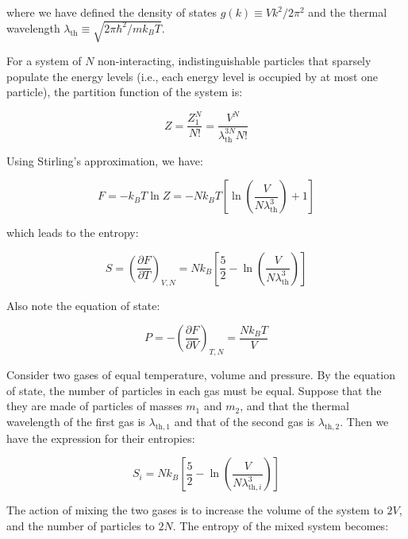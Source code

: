 \documentclass[12pt]{article}
\begin{document}
where we have defined the density of states $g(k) \equiv Vk^{2}/2\pi^{2}$ and the thermal wavelength $\lambda_{\text{th}} \equiv \sqrt{2\pi\hbar^{2}/m k_{B}T}$.

For a system of $N$ non-interacting, indistinguishable particles that sparsely populate the energy levels (i.e., each energy level is occupied by at most one particle), the partition function of the system is:

\begin{equation}
    Z = \frac{Z_{1}^{N}}{N!} = \frac{V^{N}}{\lambda_{\text{th}}^{3N} N!}
\end{equation}

Using Stirling's approximation, we have:

\begin{equation}
    F = -k_{B}T \ln{Z} = -Nk_{B}T \left[ \ln{\left( \frac{V}{N\lambda_{\text{th}}^{3}} \right)} + 1 \right]
\end{equation}

which leads to the entropy:

\begin{equation}
    S = \left( \frac{\partial F}{\partial T} \right)_{V, N} = Nk_{B} \left[ \frac{5}{2} - \ln{\left( \frac{V}{N\lambda_{\text{th}}^{3}} \right)} \right]
\end{equation}

Also note the equation of state:

\begin{equation}
    P = -\left( \frac{\partial F}{\partial V} \right)_{T, N} = \frac{Nk_{B}T}{V}
\end{equation}

Consider two gases of equal temperature, volume and pressure. By the equation of state, the number of particles in each gas must be equal. Suppose that the they are made of particles of masses $m_{1}$ and $m_{2}$, and that the thermal wavelength of the first gas is $\lambda_{\text{th}, 1}$ and that of the second gas is $\lambda_{\text{th}, 2}$. Then we have the expression for their entropies:

\begin{equation}
    S_{i} = Nk_{B} \left[ \frac{5}{2} - \ln{\left( \frac{V}{N\lambda_{\text{th}, i}^{3}} \right)} \right]
\end{equation}

The action of mixing the two gases is to increase the volume of the system to $2V$, and the number of particles to $2N$. The entropy of the mixed system becomes:
\end{document}
